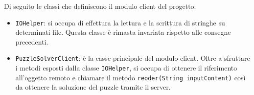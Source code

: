 Di seguito le classi che definiscono il modulo client del progetto:

\begin{itemize}
    \item \texttt{IOHelper}: si occupa di effettura la lettura e la scrittura di stringhe su determinati file.
    Questa classe è rimasta invariata rispetto alle consegne precedenti.
    \item \texttt{PuzzleSolverClient}: è la casse principale del modulo client. Oltre a sfruttare i metodi esposti
    dalla classe \texttt{IOHelper}, si occupa di ottenere il riferimento all'oggetto remoto e chiamare il metodo
    \texttt{reoder(String inputContent)} così da ottenere la soluzione del puzzle tramite il server.
\end{itemize}
